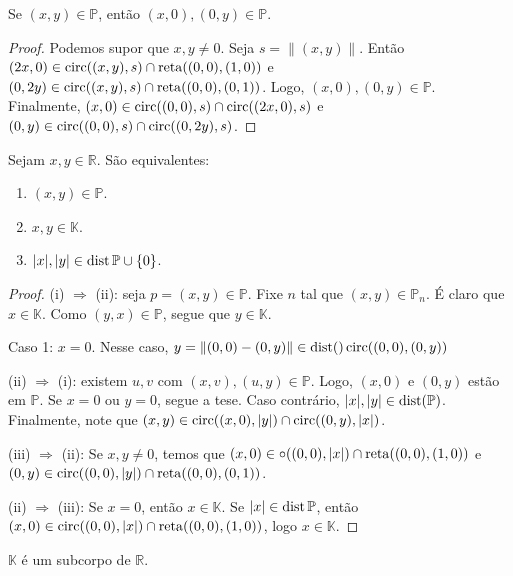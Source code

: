 \begin{lemma}
Se $(x, y) \in \mathbb P$, então $(x, 0), (0, y) \in \mathbb P$.
\end{lemma}

\begin{proof}
Podemos supor que $x, y\neq 0$. Seja $s=\|(x, y)\|$. Então $(2x, 0) \in \operatorname{circ}((x, y), s)\cap \operatorname{reta}((0, 0), (1, 0))$ e $(0, 2y) \in \operatorname{circ}((x, y), s)\cap \operatorname{reta}((0, 0), (0, 1))$. Logo, $(x, 0), (0, y)\in \mathbb P$. Finalmente, $(x, 0)\in \operatorname{circ}((0, 0), s)\cap \operatorname{circ}((2x, 0), s)$ e $(0, y)\in \operatorname{circ}((0, 0), s)\cap \operatorname{circ}((0, 2y), s)$.
\end{proof}
\begin{prop}
    Sejam $x, y \in \mathbb R$. São equivalentes:
    \begin{enumerate}[label=(\roman*)]
        \item $(x, y)\in \mathbb P$.
        \item $x, y \in \mathbb K$.
        \item $|x|, |y| \in \operatorname{dist} \mathbb P\cup\{0\}$.
    \end{enumerate}
    
\end{prop}
\begin{proof}
    (i) $\Rightarrow$ (ii): seja $p=(x, y) \in \mathbb P$. Fixe $n$ tal que $(x, y)\in \mathbb P_n$. É claro que $x\in \mathbb K$. Como $(y, x)\in \mathbb P$, segue que $y \in \mathbb K$.

    Caso 1: $x=0$. Nesse caso, $y=\|(0, 0)-(0, y)\|\in \operatorname{dist}() \operatorname{circ}((0, 0), (0, y))$

    (ii) $\Rightarrow$ (i): existem $u, v$ com $(x, v), (u, y) \in \mathbb P$. Logo, $(x, 0)$ e $(0, y)$ estão em $\mathbb P$. Se $x=0$ ou $y=0$, segue a tese. Caso contrário, $|x|, |y|\in \operatorname{dist}(\mathbb P)$. Finalmente, note que $(x, y)\in \operatorname{circ}((x, 0), |y|)\cap \operatorname{circ}((0, y), |x|)$.

    (iii) $\Rightarrow$ (ii): Se $x, y\neq 0$, temos que $(x, 0) \in \circ((0, 0), |x|)\cap \operatorname{reta}((0, 0), (1, 0))$ e $(0, y) \in \operatorname{circ}((0, 0), |y|)\cap \operatorname{reta}((0, 0), (0, 1))$.

    (ii) $\Rightarrow$ (iii): Se $x=0$, então $x \in \mathbb K$. Se $|x| \in \operatorname{dist} \mathbb P$, então $(x, 0)\in \operatorname{circ}((0, 0), |x|)\cap \operatorname{reta}((0, 0), (1, 0))$, logo $x \in \mathbb K$.
\end{proof}

\begin{prop}
    $\mathbb K$ é um subcorpo de $\mathbb R$.
\end{prop}

